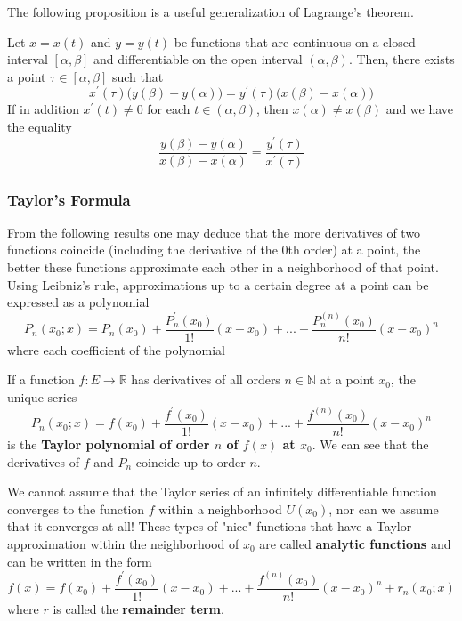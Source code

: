 \documentclass{article}
\begin{document}
    The following proposition is a useful generalization of Lagrange's theorem. 
    \begin{theorem}
    Let $x = x(t)$ and $y = y(t)$ be functions that are continuous on a closed interval $[\alpha, \beta]$ and differentiable on the open interval $(\alpha, \beta)$. Then, there exists a point $\tau \in [\alpha, \beta]$ such that
    \[x^\prime (\tau) \big( y(\beta) - y (\alpha)\big) = y^\prime (\tau) \big( x(\beta) - x(\alpha)\big)\]
    If in addition $x^\prime (t) \neq 0$ for each $t \in (\alpha, \beta)$, then $x(\alpha) \neq x(\beta)$ and we have the equality 
    \[\frac{y(\beta) - y(\alpha)}{x(\beta) - x(\alpha)} = \frac{y^\prime (\tau)}{x^\prime (\tau)}\]
    \end{theorem}

    \subsubsection{Taylor's Formula}
    From the following results one may deduce that the more derivatives of two functions coincide (including the derivative of the $0$th order) at a point, the better these functions approximate each other in a neighborhood of that point. Using Leibniz's rule, approximations up to a certain degree at a point can be expressed as a polynomial 
    \[P_n (x_0; x) = P_n (x_0) + \frac{P_n^\prime (x_0)}{1!} (x-x_0) + ... + \frac{P_n^{(n)} (x_0)}{n!} (x-x_0)^n\]
    where each coefficient of the polynomial 

    \begin{definition}
      If a function $f:E \longrightarrow \mathbb{R}$ has derivatives of all orders $n \in \mathbb{N}$ at a point $x_0$, the unique series
      \[P_n (x_0; x) = f(x_0) + \frac{f^\prime (x_0)}{1!} (x-x_0) + ... + \frac{f^{(n)} (x_0)}{n!} (x-x_0)^n\]
      is the \textbf{Taylor polynomial of order $n$ of $f(x)$ at $x_0$}. We can see that the derivatives of $f$ and $P_n$ coincide up to order $n$. 
    \end{definition}

    \begin{definition}
      We cannot assume that the Taylor series of an infinitely differentiable function converges to the function $f$ within a neighborhood $U(x_0)$, nor can we assume that it converges at all! These types of "nice" functions that have a Taylor approximation within the neighborhood of $x_0$ are called \textbf{analytic functions} and can be written in the form 
      \[f(x) =  f(x_0) + \frac{f^\prime (x_0)}{1!} (x-x_0) + ... + \frac{f^{(n)} (x_0)}{n!} (x-x_0)^n + r_n (x_0; x)\]
      where $r$ is called the \textbf{remainder term}. 
    \end{definition}
\end{document}
